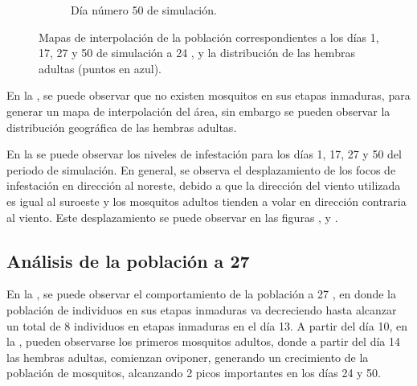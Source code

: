 \begin{figure}[!htbp]
\begin{subfigure}[b]{0.45\textwidth}
            \caption{\label{fig:niveles-infestacion-24-d}Día número 50 de simulación.}
    \end{subfigure}

    \caption{\label{fig:niveles-infestacion-24} Mapas de interpolación de la población correspondientes a los días 1, 17, 27 y 50 de simulación a 24 \textcelsius, y la distribución de las hembras adultas (puntos en azul). }
\end{figure}

En la , se puede observar que no existen mosquitos en sus
etapas inmaduras, para generar un mapa de interpolación del área, sin embargo se pueden observar la
distribución geográfica de las hembras adultas.

En la  se puede observar los niveles de infestación para los
días 1, 17, 27 y 50 del periodo de simulación. En general, se observa el desplazamiento de los
focos de infestación en dirección al noreste, debido a que la dirección del viento utilizada es
igual al suroeste y los mosquitos adultos tienden a volar en dirección contraria al viento. Este
desplazamiento se puede observar en las figuras
 ,  y
.

\subsection{Análisis de la población a 27\textcelsius}
En la , se puede observar el comportamiento de la población a
27 \textcelsius, en donde la población de individuos en sus etapas inmaduras va decreciendo hasta
alcanzar un total de 8 individuos en etapas inmaduras en el día 13. A partir del día 10, en la
, pueden observarse los primeros mosquitos adultos, donde a
partir del día 14 las hembras adultas, comienzan oviponer, generando un crecimiento de la
población de mosquitos, alcanzando 2 picos importantes en los días 24 y 50.

